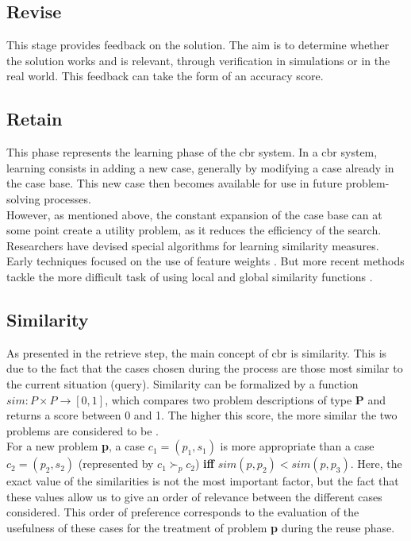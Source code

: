    \subsection{Revise}
    This stage provides feedback on the solution. The aim is to determine whether the solution works and is relevant, through verification in simulations or in the real world. This feedback can take the form of an accuracy score.
    
    
    \subsection{Retain}
    This phase represents the learning phase of the \acrshort{cbr} system. In a \acrshort{cbr} system, learning consists in adding a new case, generally by modifying a case already in the case base. This new case then becomes available for use in future problem-solving processes.\\
    However, as mentioned above, the constant expansion of the case base can at some point create a utility problem, as it reduces the efficiency of the search. Researchers have devised special algorithms for learning similarity measures. Early techniques focused on the use of feature weights \cite{cbrIntroRecent}. But more recent methods tackle the more difficult task of using local and global similarity functions \cite{shaheen2020novel, jaiswal2022f}. 

    
    
    \subsection{Similarity\label{subsec:similarity}}
    As presented in the retrieve step, the main concept of \acrshort{cbr} is similarity. This is due to the fact that the cases chosen during the process are those most similar to the current situation (query). Similarity can be formalized by a function $sim: P \times P \rightarrow [0, 1]$, which compares two problem descriptions of type \textbf{P} and returns a score between 0 and 1. The higher this score, the more similar the two problems are considered to be \cite{cbrIntroRecent}.\\
    For a new problem \textbf{p}, a case $c_1 = (p_1, s_1)$ is more appropriate than a case $c_2 = (p_2, s_2)$ (represented by $c_1 \succ_p c_2$) \textbf{iff} $sim(p, p_2) < sim(p, p_3)$. Here, the exact value of the similarities is not the most important factor, but the fact that these values allow us to give an order of relevance between the different cases considered. This order of preference corresponds to the evaluation of the usefulness of these cases for the treatment of problem \textbf{p} during the reuse phase.\\
    
